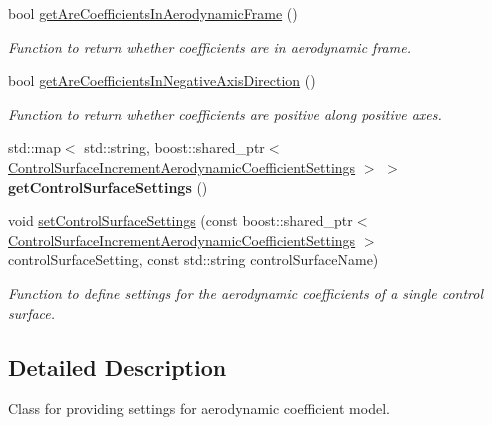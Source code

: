 \begin{DoxyCompactItemize}
bool \hyperlink{classtudat_1_1simulation__setup_1_1AerodynamicCoefficientSettings_a19ec87d7db67573936c8c60825f56875}{get\+Are\+Coefficients\+In\+Aerodynamic\+Frame} ()
\begin{DoxyCompactList}\small\item\em Function to return whether coefficients are in aerodynamic frame. \end{DoxyCompactList}\item 
bool \hyperlink{classtudat_1_1simulation__setup_1_1AerodynamicCoefficientSettings_a8446d225c5c7011a81280fe0fa1958c3}{get\+Are\+Coefficients\+In\+Negative\+Axis\+Direction} ()
\begin{DoxyCompactList}\small\item\em Function to return whether coefficients are positive along positive axes. \end{DoxyCompactList}\item 
std\+::map$<$ std\+::string, boost\+::shared\+\_\+ptr$<$ \hyperlink{classtudat_1_1simulation__setup_1_1ControlSurfaceIncrementAerodynamicCoefficientSettings}{Control\+Surface\+Increment\+Aerodynamic\+Coefficient\+Settings} $>$ $>$ {\bfseries get\+Control\+Surface\+Settings} ()\hypertarget{classtudat_1_1simulation__setup_1_1AerodynamicCoefficientSettings_a731406ba0baef00ccba55e8f965863f4}{}\label{classtudat_1_1simulation__setup_1_1AerodynamicCoefficientSettings_a731406ba0baef00ccba55e8f965863f4}

\item 
void \hyperlink{classtudat_1_1simulation__setup_1_1AerodynamicCoefficientSettings_a0e4b68cde88bc1e46fd0fccc00b5f524}{set\+Control\+Surface\+Settings} (const boost\+::shared\+\_\+ptr$<$ \hyperlink{classtudat_1_1simulation__setup_1_1ControlSurfaceIncrementAerodynamicCoefficientSettings}{Control\+Surface\+Increment\+Aerodynamic\+Coefficient\+Settings} $>$ control\+Surface\+Setting, const std\+::string control\+Surface\+Name)
\begin{DoxyCompactList}\small\item\em Function to define settings for the aerodynamic coefficients of a single control surface. \end{DoxyCompactList}\end{DoxyCompactItemize}


\subsection{Detailed Description}
Class for providing settings for aerodynamic coefficient model. 

